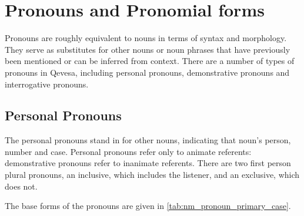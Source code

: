 \documentclass[grammar]{subfiles}
\begin{document}
\section{Pronouns and Pronomial forms}
\label{sec:nm_pronouns}

Pronouns are roughly equivalent to nouns in terms of syntax and morphology.
They serve as substitutes for other nouns or noun phrases that have
previously been mentioned or can be inferred from context.  There are a
number of types of pronouns in Qevesa, including personal pronouns,
demonstrative pronouns and interrogative pronouns.



\subsection{Personal Pronouns}
\label{ssec:nm_personal_pronouns}

The personal pronouns stand in for other nouns, indicating that noun's person,
number and case.  Personal pronouns refer only to animate referents:
demonstrative pronouns refer to inanimate referents.  There are two first
person plural pronouns, an inclusive, which includes the listener, and an
exclusive, which does not. 

The base forms of the pronouns are given in \cref{tab:nm_pronoun_primary_case}.
\end{document}
